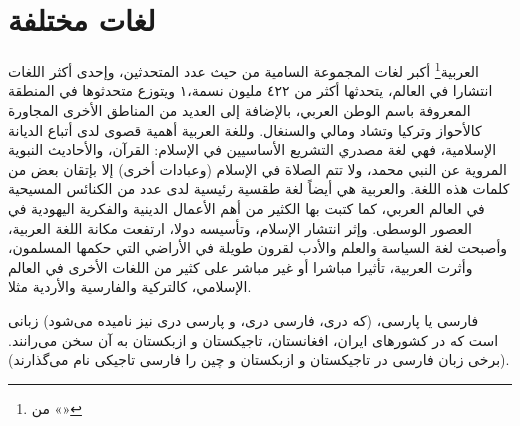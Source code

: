 \documentclass[a4paper]{article}
\begin{document}
\section{\arabicfont لغات مختلفة}


{\Large العربية}\footnote{ من «»} أكبر لغات المجموعة السامية من حيث عدد المتحدثين، وإحدى أكثر اللغات انتشارا في العالم، يتحدثها أكثر من ٤٢٢ مليون نسمة،١ ويتوزع متحدثوها في المنطقة المعروفة باسم الوطن العربي، بالإضافة إلى العديد من المناطق الأخرى المجاورة كالأحواز وتركيا وتشاد ومالي والسنغال. وللغة العربية أهمية قصوى لدى أتباع الديانة الإسلامية، فهي لغة مصدري التشريع الأساسيين في الإسلام: القرآن، والأحاديث النبوية المروية عن النبي محمد، ولا تتم الصلاة في الإسلام (وعبادات أخرى) إلا بإتقان بعض من كلمات هذه اللغة. والعربية هي أيضاً لغة طقسية رئيسية لدى عدد من الكنائس المسيحية في العالم العربي، كما كتبت بها الكثير من أهم الأعمال الدينية والفكرية اليهودية في العصور الوسطى. وإثر انتشار الإسلام، وتأسيسه دولا، ارتفعت مكانة اللغة العربية، وأصبحت لغة السياسة والعلم والأدب لقرون طويلة في الأراضي التي حكمها المسلمون، وأثرت العربية، تأثيرا مباشرا أو غير مباشر على كثير من اللغات الأخرى في العالم الإسلامي، كالتركية والفارسية والأردية مثلا.
%
%
%


\begin{farsi}
{\Large فارسی} یا پارسی، (که دری، فارسی دری، و پارسی دری نیز نامیده می‌شود) زبانی است که در کشورهای ایران، افغانستان، تاجیکستان و ازبکستان به آن سخن می‌رانند. (برخی زبان فارسی در تاجیکستان و ازبکستان و چین را فارسی تاجیکی نام می‌گذارند).
\end{farsi}

\setLR\rmfamily
\bigskip
\end{document}
